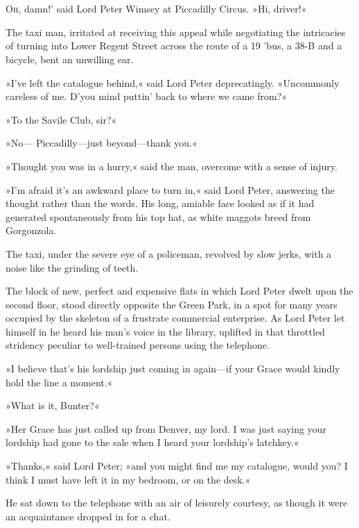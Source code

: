\chapter[Chapter \thechapter]{}
\lettrine[lines=4,ante=‘]{O}{h}, damn!' said Lord Peter Wimsey at Piccadilly Circus. »Hi, driver!«

\zz
The taxi man, irritated at receiving this appeal while negotiating the intricacies of turning into Lower Regent Street across the route of a 19 'bus, a 38-B and a bicycle, bent an unwilling ear.

»I've left the catalogue behind,« said Lord Peter deprecatingly. »Uncommonly careless of me. D'you mind puttin' back to where we came from?«

»To the Savile Club, sir?«

»No\allowbreak--- Piccadilly\allowbreak---\allowbreak just beyond\allowbreak---\allowbreak thank you.«

»Thought you was in a hurry,« said the man, overcome with a sense of injury.

»I'm afraid it's an awkward place to turn in,« said Lord Peter, answering the thought rather than the words. His long, amiable face looked as if it had generated spontaneously from his top hat, as white maggots breed from Gorgonzola.

The taxi, under the severe eye of a policeman, revolved by slow jerks, with a noise like the grinding of teeth.

The block of new, perfect and expensive flats in which Lord Peter dwelt upon the second floor, stood directly opposite the Green Park, in a spot for many years occupied by the skeleton of a frustrate commercial enterprise. As Lord Peter let himself in he heard his man's voice in the library, uplifted in that throttled stridency peculiar to well-trained persons using the telephone.

»I believe that's his lordship just coming in again\allowbreak---\allowbreak if your Grace would kindly hold the line a moment.«

»What is it, Bunter?«

»Her Grace has just called up from Denver, my lord. I was just saying your lordship had gone to the sale when I heard your lordship's latchkey.«

»Thanks,« said Lord Peter; »and you might find me my catalogue, would you? I think I must have left it in my bedroom, or on the desk.«

He sat down to the telephone with an air of leisurely courtesy, as though it were an acquaintance dropped in for a chat.

